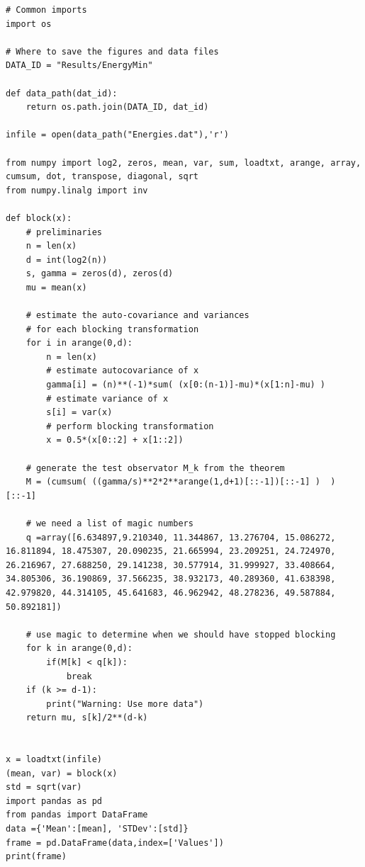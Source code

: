 \documentclass[%
oneside,                 %
final,                   %
10pt]{article}
\begin{document}
\begin{verbatim}
# Common imports
import os

# Where to save the figures and data files
DATA_ID = "Results/EnergyMin"

def data_path(dat_id):
    return os.path.join(DATA_ID, dat_id)

infile = open(data_path("Energies.dat"),'r')

from numpy import log2, zeros, mean, var, sum, loadtxt, arange, array, cumsum, dot, transpose, diagonal, sqrt
from numpy.linalg import inv

def block(x):
    # preliminaries
    n = len(x)
    d = int(log2(n))
    s, gamma = zeros(d), zeros(d)
    mu = mean(x)

    # estimate the auto-covariance and variances 
    # for each blocking transformation
    for i in arange(0,d):
        n = len(x)
        # estimate autocovariance of x
        gamma[i] = (n)**(-1)*sum( (x[0:(n-1)]-mu)*(x[1:n]-mu) )
        # estimate variance of x
        s[i] = var(x)
        # perform blocking transformation
        x = 0.5*(x[0::2] + x[1::2])
   
    # generate the test observator M_k from the theorem
    M = (cumsum( ((gamma/s)**2*2**arange(1,d+1)[::-1])[::-1] )  )[::-1]

    # we need a list of magic numbers
    q =array([6.634897,9.210340, 11.344867, 13.276704, 15.086272, 16.811894, 18.475307, 20.090235, 21.665994, 23.209251, 24.724970, 26.216967, 27.688250, 29.141238, 30.577914, 31.999927, 33.408664, 34.805306, 36.190869, 37.566235, 38.932173, 40.289360, 41.638398, 42.979820, 44.314105, 45.641683, 46.962942, 48.278236, 49.587884, 50.892181])

    # use magic to determine when we should have stopped blocking
    for k in arange(0,d):
        if(M[k] < q[k]):
            break
    if (k >= d-1):
        print("Warning: Use more data")
    return mu, s[k]/2**(d-k)


x = loadtxt(infile)
(mean, var) = block(x) 
std = sqrt(var)
import pandas as pd
from pandas import DataFrame
data ={'Mean':[mean], 'STDev':[std]}
frame = pd.DataFrame(data,index=['Values'])
print(frame)


\end{verbatim}



\end{document}
